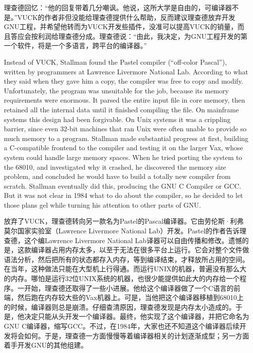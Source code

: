 \ifdefined\chs
理查德回忆：``他的回复带着几分嘲讽。他说，这所大学是自由的，可编译器不是。''VUCK的作者非但没能给理查德提供什么帮助，反而建议理查德放弃开发GNU工程，并希望他转而为VUCK开发些插件，没准可以提高VUCK的销量，而且答应会按利润给理查德分成。理查德说：``由此，我决定，为GNU工程开发的第一个软件，将是一个多语言，跨平台的编译器。''
\fi

\ifdefined\eng
Instead of VUCK, Stallman found the Pastel compiler (``off-color Pascal''), written by programmers at Lawrence Livermore National Lab. According to what they said when they gave him a copy, the compiler was free to copy and modify. Unfortunately, the program was unsuitable for the job, because its memory requirements were enormous.  It parsed the entire input file in core memory, then retained all the internal data until it finished compiling the file. On mainframe systems this design had been forgivable. On Unix systems it was a crippling barrier, since even 32-bit machines that ran Unix were often unable to provide so much memory to a program. Stallman made substantial progress at first, building a C-compatible frontend to the compiler and testing it on the larger Vax, whose system could handle large memory spaces. When he tried porting the system to the 68010, and investigated why it crashed,  he discovered the memory size problem, and concluded he would have to build a totally new compiler from scratch.  Stallman eventually did this, producing the GNU C Compiler or GCC.  But it was not clear in 1984 what to do about the compiler, so he decided to let those plans gel while turning his attention to other parts of GNU.
\fi

\ifdefined\chs
放弃了VUCK，理查德转向另一款名为Pastel的Pascal编译器。它由劳伦斯·利弗莫尔国家实验室（Lawrence Livermore National Lab）开发。Pastel的作者告诉理查德，这个编Lawrence Livermore National Lab译器可以自由传播和修改。遗憾的是，这款编译器占用内存太多，以至于无法在很多平台上运行。它会对整个文件做语法分析，然后把所有的状态都存入内存，等到编译结束，才释放所占用的空间。在当年，这种做法只能在大型机上行得通。而运行UNIX的机器，普遍没有那么大的内存。哪怕是运行32位UNIX系统的机器，也很少能提供如此大的内存给一个程序。一开始，理查德还取得了一些小进展。他给这个编译器做了一个C语言的前端，然后跑在内存较大些的Vax机器上。可是，当他把这个编译器移植到68010上的时候，编译器则总是崩溃。仔细查清原因，理查德发现是内存太小造成的。于是，他决定只能从头开发一个编译器。最终，他实现了这个编译器，并把它命名为GNU C编译器，缩写GCC。不过，在1984年，大家也还不知道这个编译器后续开发将会如何。于是，理查德一方面慢慢等着编译器相关的计划逐渐成型；另一方面着手开发GNU的其他组建。
\fi

